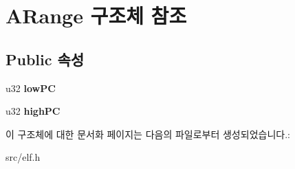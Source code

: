 \hypertarget{struct_a_range}{}\section{A\+Range 구조체 참조}
\label{struct_a_range}
\subsection*{Public 속성}
\begin{DoxyCompactItemize}
\item 
\mbox{\label{struct_a_range_a967436344fa630513a70d3fadb4c3bbe}} 
u32 {\bfseries low\+PC}
\item 
\mbox{\label{struct_a_range_aa1c1290004480b58c3fb5133e5e00430}} 
u32 {\bfseries high\+PC}
\end{DoxyCompactItemize}


이 구조체에 대한 문서화 페이지는 다음의 파일로부터 생성되었습니다.\+:\begin{DoxyCompactItemize}
\item 
src/elf.\+h\end{DoxyCompactItemize}
